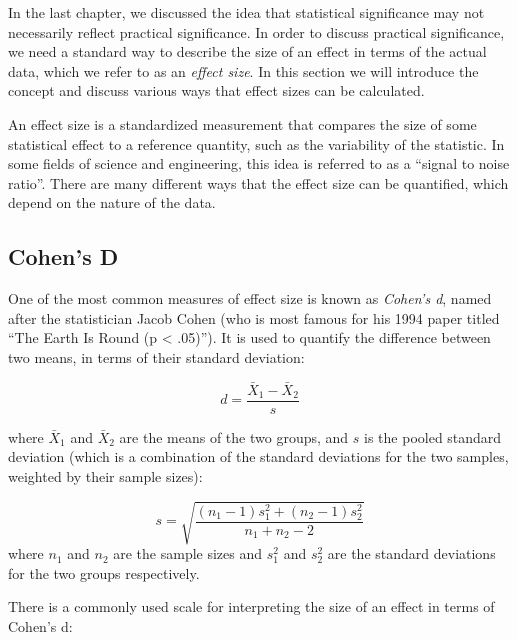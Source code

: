 \documentclass[]{book}
\theoremstyle{definition}
\theoremstyle{definition}
\theoremstyle{definition}
\theoremstyle{remark}
\begin{document}
In the last chapter, we discussed the idea that statistical significance
may not necessarily reflect practical significance. In order to discuss
practical significance, we need a standard way to describe the size of
an effect in terms of the actual data, which we refer to as an
\emph{effect size}. In this section we will introduce the concept and
discuss various ways that effect sizes can be calculated.

An effect size is a standardized measurement that compares the size of
some statistical effect to a reference quantity, such as the variability
of the statistic. In some fields of science and engineering, this idea
is referred to as a ``signal to noise ratio''. There are many different
ways that the effect size can be quantified, which depend on the nature
of the data.

\subsection{Cohen's D}\label{cohens-d}

One of the most common measures of effect size is known as \emph{Cohen's
d}, named after the statistician Jacob Cohen (who is most famous for his
1994 paper titled ``The Earth Is Round (p \textless{} .05)''). It is
used to quantify the difference between two means, in terms of their
standard deviation:

\[
d = \frac{\bar{X}_1 - \bar{X}_2}{s}
\]

where \(\bar{X}_1\) and \(\bar{X}_2\) are the means of the two groups,
and \(s\) is the pooled standard deviation (which is a combination of
the standard deviations for the two samples, weighted by their sample
sizes):

\[
s = \sqrt{\frac{(n_1 - 1)s^2_1 + (n_2 - 1)s^2_2 }{n_1 +n_2 -2}}
\] where \(n_1\) and \(n_2\) are the sample sizes and \(s^2_1\) and
\(s^2_2\) are the standard deviations for the two groups respectively.

There is a commonly used scale for interpreting the size of an effect in
terms of Cohen's d:
\end{document}
